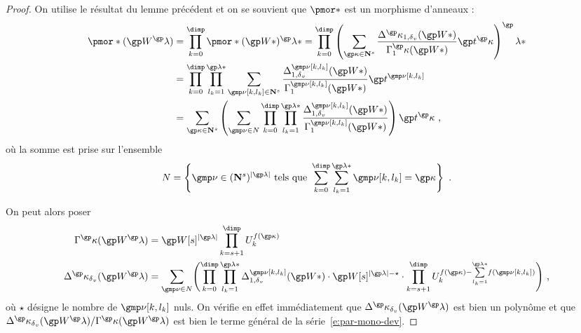\begin{proof}
  On utilise le résultat du lemme précédent et on se souvient que \( \pmor* \)
  est un morphisme d'anneaux :
  \newcommand \indl {{ \gmp\nu[\ind, \indi_\ind] }}
  \begin{align}
    \pmor*( \anyvp^\ip )
    & =
    \prod\indrange \pmor*( \anyvp* )^\ip*
    =
    \prod\indrange \left(
      \sum_{\derp \in \N^\anydim}
      \frac {
        \pmnum^\derp_{1, \dv}( \anyvp* )
      }{
        \pmden_1^\derp    ( \anyvp* )
      }
      \psp^\derp
    \right) ^\ip*
    \\ & =
    \prod\indrange
    \prod_{ \indi_\ind = 1 }^{ \ip* }
    \sum _{ \indl \in \N^\anydim }
    \frac {
      \pmnum^\indl_{1, \dv}( \anyvp* )
    }{
      \pmden_1^\indl    ( \anyvp* )
    }
    \psp^\indl
    \\ & =
    \sum_{\derp \in \N^\anydim}
    \left(
      \sum_{\gmp\nu \in N}
      \prod\indrange
      \prod_{ \indi_\ind = 1 }^{ \ip* }
      \frac {
        \pmnum^\indl_{1, \dv}( \anyvp* )
      }{
        \pmden_1^\indl    ( \anyvp* )
      }
    \right)
    \psp^\derp
    \pmm,
    \label{e:par-mono-dev}
  \end{align}
  où la somme est prise sur l'ensemble
  \begin{equation}
    N = \left\{
      \gmp\nu \in (\N^\anydim)^{\lgr\ip}
      \text{ tels que }
      \sum\indrange \sum_{\indi_\ind = 1}^{\ip*} \indl = \derp
    \right\}
    \pmm.
  \end{equation}

  On peut alors poser
  \begin{align}
    \pmden^\derp    ( \anyvp^\ip )
    & =
    \anyvp[\anydim]^{\lgr\ip}
    \prod_{\ind = \anydim + 1}^{\dimp} \pden_\ind^{f(\derp)}
    \\
    \pmnum^\derp_\dv( \anyvp^\ip )
    & =
    \sum_{\gmp\nu \in N}
    \Biggl(
    \prod\indrange
    \prod_{ \indi_\ind = 1 }^{ \ip* }
    \pmnum^\indl_{1, \dv}( \anyvp* )
    \cdot
    \anyvp[\anydim]^{\lgr\ip - \star}
    \cdot
    \prod_{\ind = \anydim + 1}^{\dimp}
    \pden_\ind^{ f(\derp)
      - \smash{ \sum\limits_{\indi_\ind = 1}^{\ip*} } f(\indl) }
    \Biggr)
    \pmm,
  \end{align}
  où \( \star \) désigne le nombre de \( \indl \) nuls. On vérifie en effet
  immédiatement que \( \pmnum^\derp_\dv( \anyvp^\ip ) \) est bien un polynôme
  et que \( \pmnum^\derp_\dv( \anyvp^\ip ) / \pmden^\derp ( \anyvp^\ip ) \)
  est bien le terme général de la série~\ref{e:par-mono-dev}.


\end{proof}
